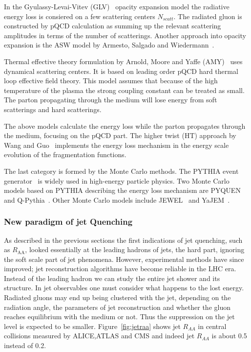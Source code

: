 In the Gyulassy-Levai-Vitev (GLV)~\cite{Gyulassy:1999zd} opacity expansion model
 the radiative energy loss is consiered on a few scattering centers $N_{scatt}$. The radiated gluon is constructed by pQCD calculation as summing up the relevant scattering amplitudes in terms of the number of scatterings. Another approach into opacity expansion is the ASW model by Armesto, Salgado and Wiedermann~\cite{Wiedemann:2000za}.

Thermal effective theory formulation by Arnold, Moore and Yaffe (AMY)~\cite{Arnold:2001ms} uses dynamical scattering centers. It is based on leading order pQCD hard thermal loop effective field theory. This model assumes that because of the high temperature of the plasma the strong coupling constant can be treated as small. The parton propagating through the medium will lose energy from soft scatterings and hard scatterings.

The above models calculate the energy loss while the parton propagates through the medium, focusing on the pQCD part. The higher twist (HT) approach by Wang and Guo~\cite{Wang:2001ifa} implements the energy loss mechanism in the energy scale evolution of the fragmentation functions.

The last category is formed by the Monte Carlo methods. The PYTHIA event generator~\cite{pythia} is widely used in high-energy particle physics. Two Monte Carlo models based on PYTHIA describing the energy loss mechanism are PYQUEN~\cite{Lokhtin:2005px} and Q-Pythia~\cite{Armesto:2009zc}. Other Monte Carlo models include JEWEL~\cite{Zapp:2008gi} and YaJEM~\cite{Renk:2009nz}. 






\subsubsection{New paradigm of jet Quenching}
As described in the previous sections the first indications of jet quenching, such as $R_{\mathrm{AA}}$, looked essentially at the leading hadrons of jets, the hard part, ignoring the soft scale part of jet phenomena. However, experimental methods have since improved; jet reconstruction algorithms have become reliable in the LHC era. Instead of the leading hadron we can study the entire jet shower and its structure. In jet observables one must consider what happens to the lost energy. Radiated gluons may end up being clustered with the jet, depending on the radiation angle, the parameters of jet reconstruction and whether the gluon reaches equilibrium with the medium or not. Thus the suppression on the jet level is expected to be smaller. Figure~\ref{fig:jetraa} shows jet $R_{AA}$ in central \PbPb collisions measured by ALICE,ATLAS and CMS and indeed jet $R_{AA}$ is about 0.5 instead of 0.2. %


